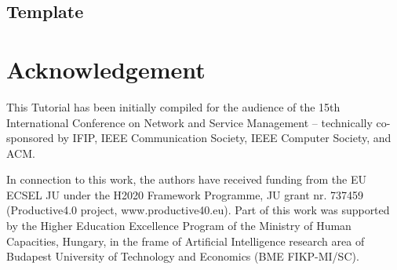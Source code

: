 \documentclass[a4paper]{article}
\begin{document}
\subsection{Template}

\section*{Acknowledgement}
This Tutorial has been initially compiled for the audience of the 15th International Conference on Network and Service Management -- technically co-sponsored by IFIP, IEEE Communication Society, IEEE Computer Society, and ACM.

In connection to this work, the authors have received funding  from  the  EU  ECSEL JU under the H2020 Framework Programme, JU grant nr.  737459  (Productive4.0  project,  www.productive40.eu).
Part of this work was supported by the Higher Education Excellence  Program  of  the  Ministry  of  Human  Capacities, Hungary, in the frame of Artificial Intelligence research area of Budapest University of Technology and Economics (BME FIKP-MI/SC). 



\end{document}
